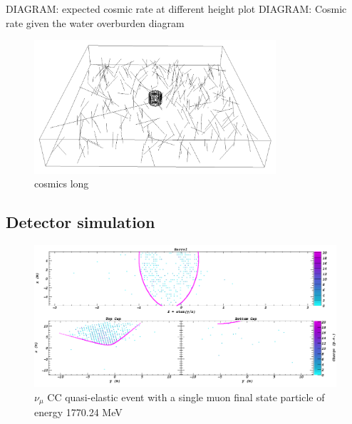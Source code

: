 DIAGRAM: expected cosmic rate at different height plot
DIAGRAM: Cosmic rate given the water overburden diagram

\begin{figure} %
    \includegraphics[width=0.8\textwidth]{diagrams/5-chips/cosmics.png}
    \caption[cosmics short]
    {cosmics long}
    \label{fig:cosmics}
\end{figure}

\subsection{Detector simulation} %
\label{sec:chips_monte_carlo_sim} %

\begin{figure} %
    \includegraphics[width=\textwidth]{diagrams/5-chips/sim_event.png}
    \caption[sim event short]
    {$\nu_{\mu}$ CC quasi-elastic event with a single muon final state particle of energy
        1770.24 MeV}
    \label{fig:sim_event}
\end{figure}